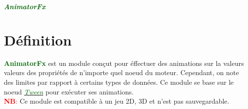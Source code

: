 \documentclass[a4paper, 11pt]{article}
\begin{document}
	\pagecolor{silver}
	\huge{\hspace{14.5cm}\textit{\textbf{\textcolor{darkgreen}{AnimatorFx}}}}\large{} \tableofcontents
	\newpage
	\section{Définition}
	\textcolor{darkgreen}{\textbf{AnimatorFx}} est un module conçut pour éffectuer des animations sur la 
	valeurs valeurs des propriétés de n'importe quel noeud du moteur. Cependant, on note des limites par 
	rapport à certains types de données. Ce module se base sur le noeud
	\href{https://docs.godotengine.org/en/stable/classes/class_tween.html}{\textit{\textcolor{darkgreen}
	{Tween}}} pour exécuter ses animations.\\
	\textcolor{red}{\textbf{NB}:} Ce module est compatible à un jeu 2D, 3D et n'est pas sauvegardable.

\end{document}
